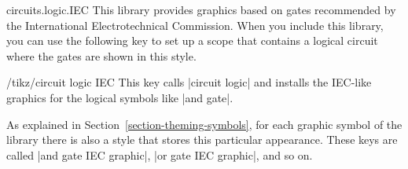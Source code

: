 \begin{tikzlibrary}{circuits.logic.IEC}
    This library provides graphics based on gates recommended by the
    International Electrotechnical Commission.  When you include this library,
    you can use the following key to set up a scope that contains a logical
    circuit where the gates are shown in this style.

    \begin{key}{/tikz/circuit logic IEC}
        This key calls |circuit logic| and installs the IEC-like graphics for
        the logical symbols like |and gate|.

        As explained in Section~\ref{section-theming-symbols}, for each graphic
        symbol of the library there is also a style that stores this particular
        appearance. These keys are called |and gate IEC graphic|,
        |or gate IEC graphic|, and so on.
\begin{codeexample}[preamble={\usetikzlibrary{circuits.logic.IEC}}]
\end{codeexample}
    \end{key}
\end{tikzlibrary}

